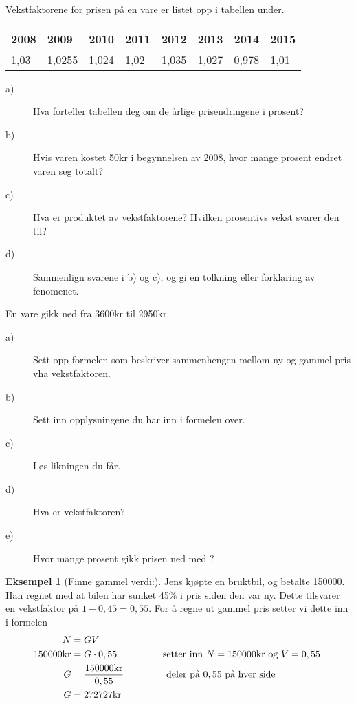 \documentclass[a4, 11pt, twoside]{article}
\theoremstyle{definition}
\newtheorem{eksempel}{Eksempel}
\begin{document}
\begin{Exercise}
Vekstfaktorene for prisen på en vare er listet opp
i tabellen under. \newline
\begin{center}
\begin{tabular}{| l | l | l | l | l | l | l | l |}
\hline
2008 & 2009   & 2010   & 2011   & 2012   & 2013   & 2014   & 2015 \\ \hline
1,03 & 1,0255 & 1,024 & 1,02   & 1,035  & 1,027   & 0,978  & 1,01 \\ \hline
\end{tabular}
\end{center}
\begin{description}
\item[a)] Hva forteller tabellen deg om de årlige prisendringene i prosent?
\item[b)] Hvis varen kostet 50kr i begynnelsen av 2008, 
hvor mange prosent endret varen seg totalt? 
\item[c)] Hva er produktet av vekstfaktorene? Hvilken prosentivs vekst
svarer den til?
\item[d)] Sammenlign svarene i b) og c), og gi en tolkning eller forklaring
av fenomenet.
\end{description}
\end{Exercise}

\begin{Exercise}
  En vare gikk ned fra 3600kr til 2950kr.
  \begin{description}
    \item[a)] Sett opp formelen som beskriver sammenhengen mellom ny og gammel pris vha vekstfaktoren.
    \item[b)] Sett inn opplysningene du har inn i formelen over.
    \item[c)] Løs likningen du får.
    \item[d)] Hva er vekstfaktoren?
    \item[e)] Hvor mange prosent gikk prisen ned med ?
  \end{description}
\end{Exercise}

\begin{eksempel}[Finne gammel verdi:]
Jens kjøpte en bruktbil, og betalte 150000. Han regnet med at bilen har sunket
45\% i pris siden den var ny. Dette tilsvarer en vekstfaktor på $1 - 0,45 = 0,55$.
For å regne ut gammel pris setter vi dette inn i formelen
\begin{align*}
  N & = GV \\
  150000\text{kr} & = G\cdot0,55     \;\;\;\;\;\;\;\;\;\;\;\;\;\;\;\; \text{   setter inn $ N = 150000$kr og $V = 0,55$ } \\
  G & = \frac{150000\text{kr}}{0,55} \;\;\;\;\;\;\;\;\;\;\;\;\;\;\;\; \text{deler på $0,55$ på hver side } \\
  G & = 272727\text{kr}
\end{align*}
\end{eksempel}
\end{document}
